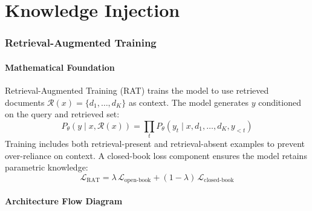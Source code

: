 \part{Knowledge Injection}

\section{Retrieval-Augmented Training}

\subsection{Mathematical Foundation}
Retrieval-Augmented Training (RAT) trains the model to use retrieved documents $\mathcal{R}(x) = \{d_1,\ldots,d_K\}$ as context. The model generates $y$ conditioned on the query and retrieved set:
\begin{equation}
  P_\theta(y \mid x, \mathcal{R}(x)) = \prod_t P_\theta(y_t \mid x, d_1,\ldots,d_K, y_{<t})
\end{equation}
Training includes both retrieval-present and retrieval-absent examples to prevent over-reliance on context. A closed-book loss component ensures the model retains parametric knowledge:
\begin{equation}
  \mathcal{L}_{\text{RAT}} = \lambda\,\mathcal{L}_{\text{open-book}} + (1-\lambda)\,\mathcal{L}_{\text{closed-book}}
\end{equation}

\subsection{Architecture Flow Diagram}

